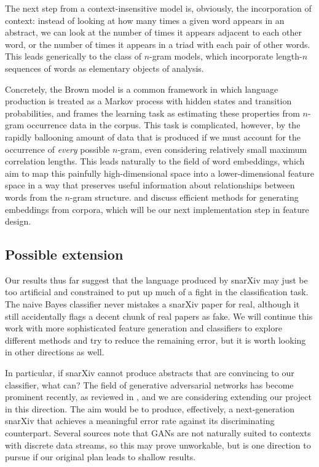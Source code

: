 \documentclass{article}
\begin{document}
The next step from a context-insensitive model is, obviously, the incorporation of context: instead of looking at how many times a given word appears in an abstract, we can look at the number of times it appears adjacent to each other word, or the number of times it appears in a triad with each pair of other words. This leads generically to the class of $n$-gram models, which incorporate length-$n$ sequences of words as elementary objects of analysis.

Concretely, the Brown model is a common framework in which language production is treated as a Markov process with hidden states and transition probabilities, and frames the learning task as estimating these properties from $n$-gram occurrence data in the corpus.
This task is complicated, however, by the rapidly ballooning amount of data that is produced if we must account for the occurrence of \emph{every} possible $n$-gram, even considering relatively small maximum correlation lengths.
This leads naturally to the field of word embeddings, which aim to map this painfully high-dimensional space into a lower-dimensional feature space in a way that preserves useful information about relationships between words from the $n$-gram structure.
\citet{stratos2015model} and \citet{stratos2014spectral} discuss efficient methods for generating embeddings from corpora, which will be our next implementation step in feature design.














\subsection{Possible extension}
Our results thus far suggest that the language produced by snarXiv may just be too artificial and constrained to put up much of a fight in the classification task.
The naive Bayes classifier never mistakes a snarXiv paper for real, although it still accidentally flags a decent chunk of real papers as fake.
We will continue this work with more sophisticated feature generation and classifiers to explore different methods and try to reduce the remaining error, but it is worth looking in other directions as well.

In particular, if snarXiv cannot produce abstracts that are convincing to our classifier, what can?
The field of generative adversarial networks has become prominent recently, as reviewed in \citet{creswell2018generative}, and we are considering extending our project in this direction.
The aim would be to produce, effectively, a next-generation snarXiv that achieves a meaningful error rate against its discriminating counterpart.
Several sources note that GANs are not naturally suited to contexts with discrete data streams, so this may prove unworkable, but is one direction to pursue if our original plan leads to shallow results.
\end{document}
